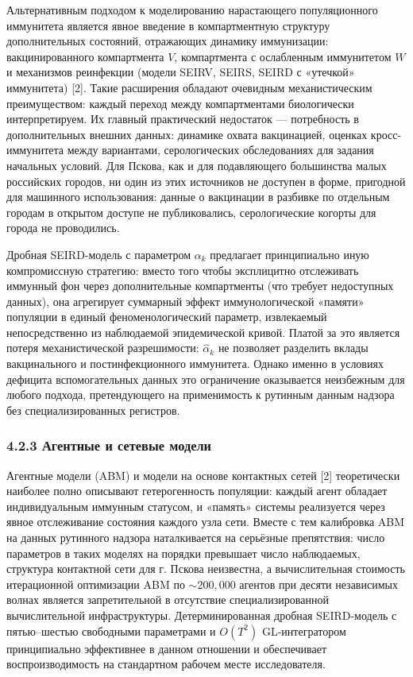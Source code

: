 \documentclass[12pt]{article}
\begin{document}
Альтернативным подходом к моделированию нарастающего популяционного
иммунитета является явное введение в компартментную структуру
дополнительных состояний, отражающих динамику иммунизации:
вакцинированного компартмента \(V\), компартмента с ослабленным
иммунитетом \(W\) и механизмов реинфекции (модели SEIRV, SEIRS, SEIRD с
«утечкой» иммунитета) {[}2{]}. Такие расширения обладают очевидным
механистическим преимуществом: каждый переход между компартментами
биологически интерпретируем. Их главный практический недостаток ---
потребность в дополнительных внешних данных: динамике охвата
вакцинацией, оценках кросс-иммунитета между вариантами, серологических
обследованиях для задания начальных условий. Для Пскова, как и для
подавляющего большинства малых российских городов, ни один из этих
источников не доступен в форме, пригодной для машинного использования:
данные о вакцинации в разбивке по отдельным городам в открытом доступе
не публиковались, серологические когорты для города не проводились.

Дробная SEIRD-модель с параметром \(\alpha_k\) предлагает принципиально
иную компромиссную стратегию: вместо того чтобы эксплицитно отслеживать
иммунный фон через дополнительные компартменты (что требует недоступных
данных), она агрегирует суммарный эффект иммунологической «памяти»
популяции в единый феноменологический параметр, извлекаемый
непосредственно из наблюдаемой эпидемической кривой. Платой за это
является потеря механистической разрешимости: \(\hat{\alpha}_k\) не
позволяет разделить вклады вакцинального и постинфекционного иммунитета.
Однако именно в условиях дефицита вспомогательных данных это ограничение
оказывается неизбежным для любого подхода, претендующего на применимость
к рутинным данным надзора без специализированных регистров.

\subsubsection{4.2.3 Агентные и сетевые
модели}\label{ux430ux433ux435ux43dux442ux43dux44bux435-ux438-ux441ux435ux442ux435ux432ux44bux435-ux43cux43eux434ux435ux43bux438}

Агентные модели (ABM) и модели на основе контактных сетей {[}2{]}
теоретически наиболее полно описывают гетерогенность популяции: каждый
агент обладает индивидуальным иммунным статусом, и «память» системы
реализуется через явное отслеживание состояния каждого узла сети. Вместе
с тем калибровка ABM на данных рутинного надзора наталкивается на
серьёзные препятствия: число параметров в таких моделях на порядки
превышает число наблюдаемых, структура контактной сети для г. Пскова
неизвестна, а вычислительная стоимость итерационной оптимизации ABM по
\(\sim 200,000\) агентов при десяти независимых волнах является
запретительной в отсутствие специализированной вычислительной
инфраструктуры. Детерминированная дробная SEIRD-модель с пятью--шестью
свободными параметрами и \(O(T^2)\) GL-интегратором принципиально
эффективнее в данном отношении и обеспечивает воспроизводимость на
стандартном рабочем месте исследователя.
\end{document}

